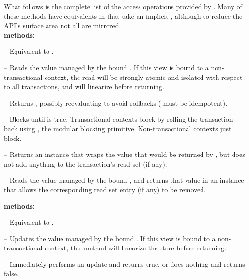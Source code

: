 What follows is the complete list of the access operations provided by
.  Many of these methods have equivalents in 
that take an implicit , although to reduce the API's surface
area not all are mirrored. \vspace{4pt}\\
\textbf{ methods:}
\begin{packed_itemize}
\setlength{\itemsep}{4pt}

\item {}-- Equivalent to .

\item {}-- Reads the value managed by the
bound .  If this view is bound to a non-transactional context,
the read will be strongly atomic and isolated with respect to all
transactions, and will linearize before returning.

\item \code{map[}\code{](f: }\code{ => }\code{): }--
Returns , possibly reevaluating 
to avoid rollbacks ( must be idempotent).

\item {}\code{ => }\code{) }-- Blocks
until  is true.  Transactional contexts block by rolling
the transaction back using , the modular blocking primitive.
Non-transactional contexts just block.

\item {}\code{[}\code{] }--
Returns an instance that wraps the value that would be returned by
, but does not add anything to the transaction's read set
(if any).

\item {}\code{[}\code{] }--
Reads the value managed by the bound , and returns that
value in an instance that allows the corresponding read set entry (if any)
to be removed.

\end{packed_itemize}
\textbf{ methods:}
\begin{packed_itemize}
\setlength{\itemsep}{4pt}

\item {}\code{) }-- Equivalent to .

\item {}\code{) }-- Updates the value managed by the
bound .  If this view is bound to a non-transactional context,
this method will linearize the store before returning.

\item {}\code{): }-- Immediately
performs an update and returns true, or does nothing and returns false.

\end{packed_itemize}
